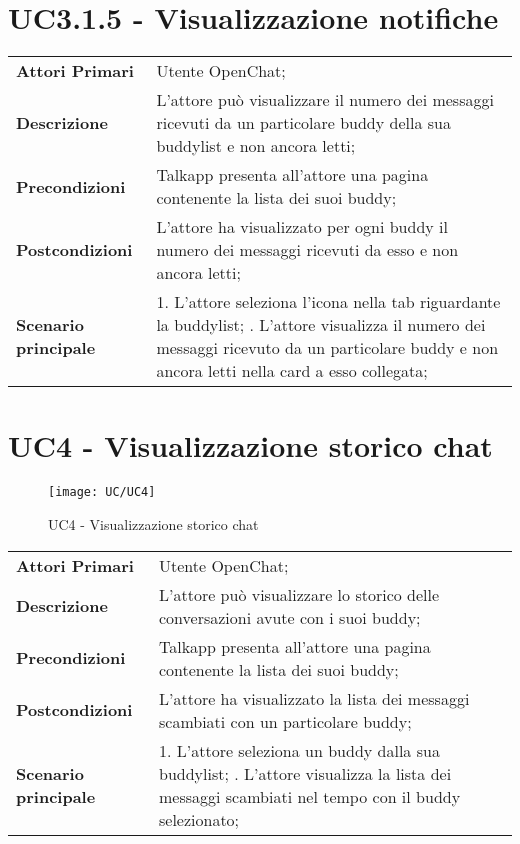 \section{UC3.1.5 - Visualizzazione notifiche}
\begin{center}
	\bgroup
	\def\arraystretch{1.8}     
	\begin{longtable}{  p{4cm} | p{9.5cm} } 
		\textbf{Attori Primari} & Utente OpenChat; \\ 
		\textbf{Descrizione} &  L'attore può visualizzare il numero dei messaggi ricevuti da un particolare buddy della sua buddylist e non ancora letti; \\ 
		\textbf{Precondizioni}  & Talkapp presenta all'attore una pagina contenente la lista dei suoi buddy; \\
		\textbf{Postcondizioni} & L'attore ha visualizzato per ogni buddy il numero dei messaggi ricevuti da esso e non ancora letti;  \\ 
		\textbf{Scenario principale} & 
		1. L'attore seleziona l'icona nella tab riguardante la buddylist; \newline
		2. L'attore visualizza il numero dei messaggi ricevuto da un particolare buddy e non ancora letti nella card a esso collegata;
	\end{longtable}
	\egroup
\end{center}


\section{UC4 - Visualizzazione storico chat}
\begin{figure}[H] 
	\centering
	\texttt{[image: UC/UC4]}
	\caption{UC4 - Visualizzazione storico chat}
\end{figure}
\begin{center}
	\bgroup
	\def\arraystretch{1.8}     
	\begin{longtable}{  p{4cm} | p{9.5cm} } 
		\textbf{Attori Primari} & Utente OpenChat; \\ 
		\textbf{Descrizione} &  L'attore può visualizzare lo storico delle conversazioni avute con i suoi buddy; \\ 
		\textbf{Precondizioni}  & Talkapp presenta all'attore una pagina contenente la lista dei suoi buddy; \\
		\textbf{Postcondizioni} & L'attore ha visualizzato la lista dei messaggi scambiati con un particolare buddy;  \\ 
		\textbf{Scenario principale} & 
		1. L'attore seleziona un buddy dalla sua buddylist; \newline
		2. L'attore visualizza la lista dei messaggi scambiati nel tempo con il buddy selezionato;
	\end{longtable}
	\egroup
\end{center}

